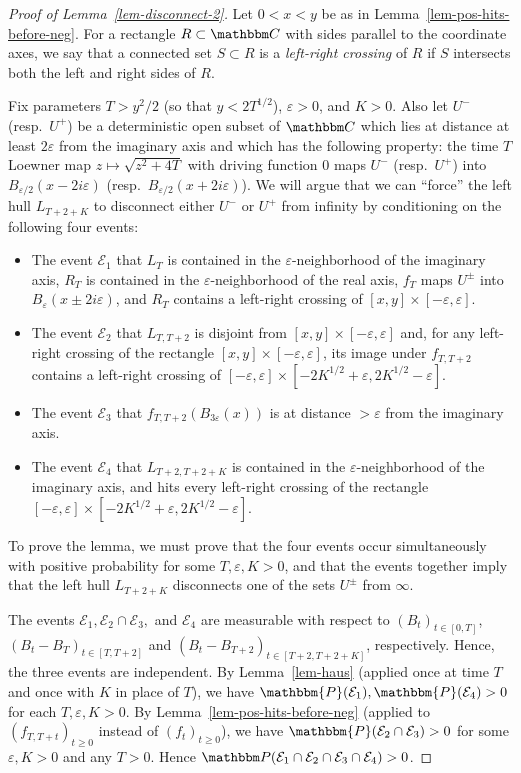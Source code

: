 \documentclass[11pt]{article}
\theoremstyle{plain}
\theoremstyle{definition}
\numberwithin{equation}{section}
\newcommand{\BB}{\mathbbm}
\newcommand{\ep}{\varepsilon}
\newcommand{\mcl}{\mathcal}
\begin{document}
\begin{proof}[Proof of Lemma~\ref{lem-disconnect-2}]
Let $0<x<y$ be as in Lemma~\ref{lem-pos-hits-before-neg}. 
For a rectangle $R\subset \BB C$ with sides parallel to the coordinate axes, we say that a connected set $S\subset R$ is a \emph{left-right crossing} of $R$ if $S$ intersects both the left and right sides of $R$.

Fix parameters $T>y^2/2$ (so that $y < 2T^{1/2}$), $\ep > 0$, and $K>0$.  
Also let $U^-$ (resp.\ $U^+$) be a deterministic open subset of $\BB C$ which lies at distance at least $2\ep$ from the imaginary axis and which has the following property: the time $T$ Loewner map $z\mapsto \sqrt{z^2 + 4T}$ with driving function 0 maps $U^-$ (resp.\ $U^+$) into $B_{\ep/2}(x-2i\ep)$ (resp.\ $B_{\ep/2}(x+2i\ep)$).
We will argue that we can ``force'' the left hull $L_{T+2+K}$ to disconnect either $U^-$ or $U^+$ from infinity by conditioning on the following four events:
\begin{itemize}
\item
The event $\mcl E_1$ that $L_T$ is contained in the $\ep$-neighborhood of the imaginary axis, $R_T$ is contained in the $\ep$-neighborhood of the real axis, $f_T$ maps $U^\pm$ into $B_\ep(x \pm 2i\ep)$, and $R_T$ contains a left-right crossing of $[x,y]\times[-\ep,\ep]$. 
\item
The event $\mcl E_2$ that $L_{T,T+2}$ is disjoint from $[x,y]\times[-\ep,\ep]$ and, for any left-right crossing of the rectangle $[x,y] \times [-\ep,\ep]$, its image under $f_{T,T+2}$ contains a left-right crossing of $[-\ep,\ep] \times [-2K^{1/2}+\ep,2 K^{1/2}-\ep]$.
\item
The event $\mcl E_3$ that $f_{T,T+2}(B_{3\ep}(x))$ is at distance $>\ep$ from the imaginary axis.
\item
The event $\mcl E_4$ that $L_{T+2,T+2+K}$ is contained in the $\ep$-neighborhood of the imaginary axis, and hits every left-right crossing of the rectangle  $[-\ep,\ep] \times [-2K^{1/2}+\ep,2 K^{1/2}-\ep]$.
\end{itemize}
To prove the lemma, we must prove that the four events occur simultaneously with positive probability for some $T,\ep,K>0$, and that the events together imply that the left hull $L_{T+2+K}$ disconnects one of the sets $U^\pm$ from $\infty$.

The events $\mcl E_1,\mcl E_2 \cap \mcl E_3,$ and $\mcl E_4$ are measurable with respect to $(B_t)_{t \in [0,T]}$, $(B_t-B_T)_{t \in [T,T+2]}$ and $(B_t-B_{T+2})_{t \in [T+2,T+2+K]}$, respectively. Hence, the three events are independent. 
By Lemma~\ref{lem-haus} (applied once at time $T$ and once with $K$ in place of $T$), we have $\BB{P}(\mcl E_1), \BB{P}(\mcl E_4) > 0$ for each $T,\ep , K>0$.
By Lemma~\ref{lem-pos-hits-before-neg} (applied to $(f_{T,T+t})_{t\geq 0}$ instead of $(f_t)_{t\geq 0}$), we have $\BB{P}(\mcl E_2 \cap \mcl E_3) > 0$ for some $\ep,K>0$ and any $T>0$. Hence $\BB P(\mcl E_1\cap\mcl E_2\cap \mcl E_3\cap \mcl E_4) > 0$.


\end{proof}
\end{document}
